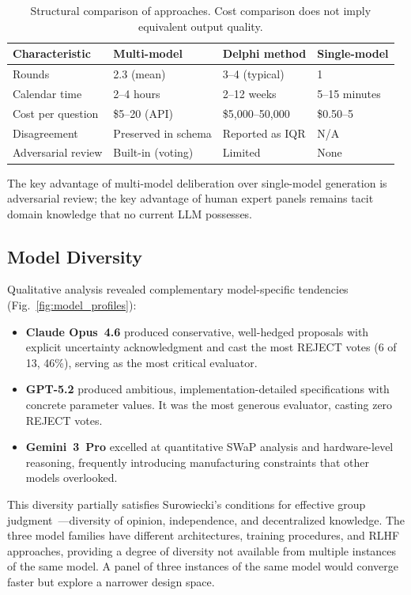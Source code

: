 \documentclass[11pt,a4paper]{article}
\begin{document}
\begin{table}[ht]
\centering
\caption{Structural comparison of approaches. Cost comparison does not imply equivalent output quality.}
\label{tab:comparison}
\begin{tabular}{@{}p{2.5cm}p{3.5cm}p{3.5cm}p{3cm}@{}}
\toprule
\textbf{Characteristic} & \textbf{Multi-model} & \textbf{Delphi method} & \textbf{Single-model} \\
\midrule
Rounds & 2.3 (mean) & 3--4 (typical) & 1 \\
Calendar time & 2--4 hours & 2--12 weeks & 5--15 minutes \\
Cost per question & \$5--20 (API) & \$5{,}000--50{,}000 & \$0.50--5 \\
Disagreement & Preserved in schema & Reported as IQR & N/A \\
Adversarial review & Built-in (voting) & Limited & None \\
\bottomrule
\end{tabular}
\end{table}

The key advantage of multi-model deliberation over single-model generation is adversarial review; the key advantage of human expert panels remains tacit domain knowledge that no current LLM possesses.

\subsection{Model Diversity}

Qualitative analysis revealed complementary model-specific tendencies (Fig.~\ref{fig:model_profiles}):

\begin{itemize}[nosep]
    \item \textbf{Claude Opus~4.6} produced conservative, well-hedged proposals with explicit uncertainty acknowledgment and cast the most REJECT votes (6 of 13, 46\%), serving as the most critical evaluator.
    \item \textbf{GPT-5.2} produced ambitious, implementation-detailed specifications with concrete parameter values. It was the most generous evaluator, casting zero REJECT votes.
    \item \textbf{Gemini~3~Pro} excelled at quantitative SWaP analysis and hardware-level reasoning, frequently introducing manufacturing constraints that other models overlooked.
\end{itemize}

This diversity partially satisfies Surowiecki's conditions for effective group judgment~\cite{surowiecki2004wisdom}---diversity of opinion, independence, and decentralized knowledge. The three model families have different architectures, training procedures, and RLHF approaches, providing a degree of diversity not available from multiple instances of the same model. A panel of three instances of the same model would converge faster but explore a narrower design space.
\end{document}

